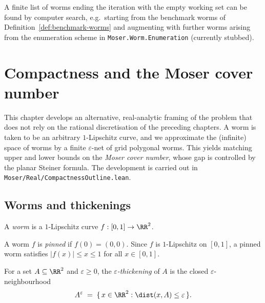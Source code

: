 \begin{proposition}
  \label{prop:terminating-sequence}
  A finite list of worms ending the iteration with the empty working
  set can be found by computer search, e.g.\ starting from the
  benchmark worms of Definition~\ref{def:benchmark-worms} and augmenting
  with further worms arising from the enumeration scheme in
  \texttt{Moser.Worm.Enumeration} (currently stubbed).
\end{proposition}

\chapter{Compactness and the Moser cover number}

This chapter develops an alternative, real-analytic framing of the problem
that does not rely on the rational discretisation of the preceding chapters.
A worm is taken to be an arbitrary $1$-Lipschitz curve, and we approximate
the (infinite) space of worms by a finite $\varepsilon$-net of grid
polygonal worms. This yields matching upper and lower bounds on the
\emph{Moser cover number}, whose gap is controlled by the planar Steiner
formula. The development is carried out in
\texttt{Moser/Real/CompactnessOutline.lean}.

\section{Worms and thickenings}

\begin{definition}
    \label{def:lipschitz-worm}
    A \emph{worm} is a $1$-Lipschitz curve $f : [0,1] \to \RR^2$.
\end{definition}

\begin{definition}
    \label{def:pinnedWorm}
    A worm $f$ is \emph{pinned} if $f(0) = (0,0)$. Since $f$ is $1$-Lipschitz
    on $[0,1]$, a pinned worm satisfies $\lvert f(x) \rvert \le x \le 1$ for
    all $x \in [0,1]$.
\end{definition}

\begin{definition}
    \label{def:thickening}
    For a set $A \subseteq \RR^2$ and $\varepsilon \ge 0$, the
    \emph{$\varepsilon$-thickening} of $A$ is the closed
    $\varepsilon$-neighbourhood
    \[
        A^{\varepsilon} \;=\; \{\, x \in \RR^2 : \dist(x, A) \le \varepsilon \,\}.
    \]
\end{definition}

